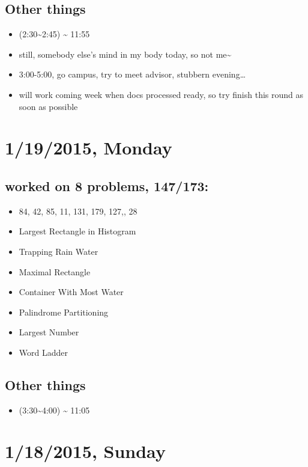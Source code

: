 \documentclass[9pt,b5paper]{article}
\begin{document}
\subsection{Other things}
\label{sec-7-2}
\begin{itemize}
\item (2:30\textasciitilde{}2:45) \textasciitilde{} 11:55
\item still, somebody else's mind in my body today, so not me\textasciitilde{}
\item 3:00-5:00, go campus, try to meet advisor, stubbern evening\ldots{}
\item will work coming week when docs processed ready, so try finish this round as soon as possible
\end{itemize}
\section{1/19/2015, Monday}
\label{sec-8}
\subsection{worked on 8 problems, 147/173:}
\label{sec-8-1}
\begin{itemize}
\item 84, 42, 85, 11, 131, 179, 127,, 28
\item Largest Rectangle in Histogram
\item Trapping Rain Water
\item Maximal Rectangle
\item Container With Most Water
\item Palindrome Partitioning
\item Largest Number
\item Word Ladder
\end{itemize}
\subsection{Other things}
\label{sec-8-2}
\begin{itemize}
\item (3:30\textasciitilde{}4:00) \textasciitilde{} 11:05
\end{itemize}
\section{1/18/2015, Sunday}
\label{sec-9}
\end{document}
